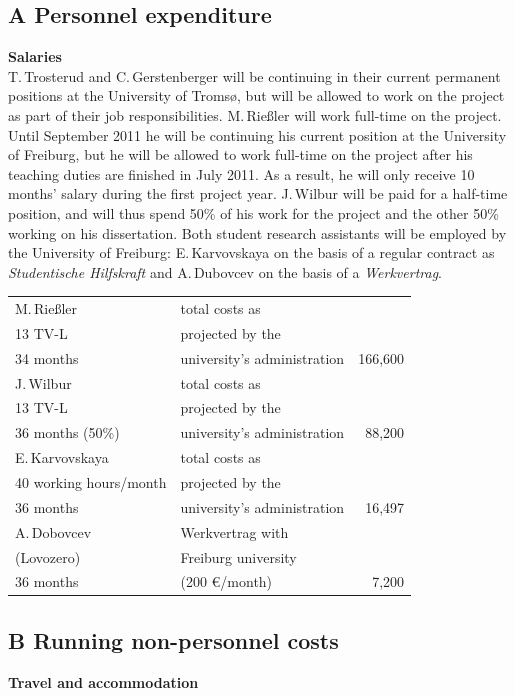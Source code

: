 \documentclass[a4paper,12pt]{article}
\begin{document}
{{\subsection*{A Personnel expenditure}
\noindent \textbf{Salaries}\\
T.\,Trosterud and C.\,Gersten\-berger will be continuing in their current permanent positions at the University of Tromsø, but will be allowed to work on the project as part of their job responsibilities. M.\,Rießler will work full-time on the project. Until September 2011 he will be continuing his current position at the University of Freiburg, but he will be allowed to work full-time on the project after his teaching duties are finished in July 2011. As a result, he will only receive 10 months' salary during the first project year. J.\,Wilbur will be paid for a half-time position, and will thus spend 50\% of his work for the project and the other 50\% working on his dissertation. Both student research assistants will be employed by the University of Freiburg: E.\,Karvovskaya on the basis of a regular contract as {\it Studentische Hilfskraft} and A.\,Dubovcev on the basis of a {\it Werkvertrag}.
\newpage
\begin{longtable}{| l | l | r |}
\hline
M.\,Rießler&total costs as&\\
13 TV-L&projected by the&\\
34 months&university's administration&166,600\\
\hline
J.\,Wilbur&total costs as&\\
13 TV-L&projected by the&\\
36 months (50\%)&university's administration&88,200\\
\hline
E.\,Karvovskaya&total costs as&\\
40 working hours/month& projected by the&\\
36 months&university's administration&16,497\\
\hline
A.\,Dobovcev	&Werkvertrag with	&\\
(Lovozero)	&Freiburg university	&\\
36 months		&(200 €/month)		&7,200\\
\hline
\end{longtable}

\subsection*{B Running non-personnel costs}
\noindent \textbf{Travel and accommodation}

}}
\end{document}
